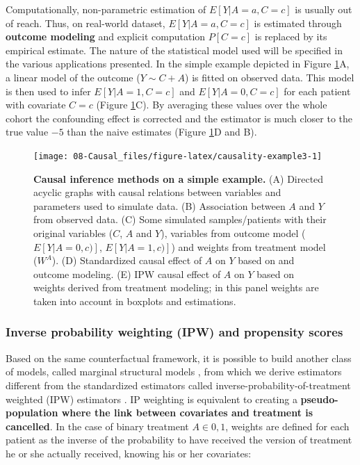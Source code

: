 \documentclass[a4paper,12pt,twoside,onecolumn,openright,final,oldfontcommands]{memoir}
\begin{document}
Computationally, non-parametric estimation of \(E[Y | A=a, C=c]\) is
usually out of reach. Thus, on real-world dataset, \(E[Y | A=a, C=c]\)
is estimated through \textbf{outcome modeling} and explicit computation
\(P[C=c]\) is replaced by its empirical estimate. The nature of the
statistical model used will be specified in the various applications
presented. In the simple example depicted in Figure
\ref{fig:causality-example3}A, a linear model of the outcome
(\(Y\sim C+A\)) is fitted on observed data. This model is then used to
infer \(E[Y | A=1, C=c]\) and \(E[Y | A=0, C=c]\) for each patient with
covariate \(C=c\) (Figure \ref{fig:causality-example3}C). By averaging
these values over the whole cohort the confounding effect is corrected
and the estimator is much closer to the true value \(-5\) than the naive
estimates (Figure \ref{fig:causality-example3}D and B).

\begin{figure}

{\centering \texttt{[image: 08-Causal\_files/figure-latex/causality-example3-1]} 

}

\caption[Causal inference methods on a simple example]{\textbf{Causal inference methods on a
simple example.} (A) Directed acyclic graphs with causal relations
between variables and parameters used to simulate data. (B) Association
between \(A\) and \(Y\) from observed data. (C) Some simulated
samples/patients with their original variables (\(C\), \(A\) and \(Y\)),
variables from outcome model (\(E[Y|A=0,c)]\), \(E[Y|A=1,c)]\)) and
weights from treatment model (\(W^A\)). (D) Standardized causal effect
of \(A\) on \(Y\) based on and outcome modeling. (E) IPW causal effect
of \(A\) on \(Y\) based on weights derived from treatment modeling; in
this panel weights are taken into account in boxplots and estimations.}\label{fig:causality-example3}
\end{figure}












\subsubsection{Inverse probability weighting (IPW) and propensity
scores}\label{IPW-classic}

Based on the same counterfactual framework, it is possible to build
another class of models, called marginal structural models
\citep{robins2000marginal}, from which we derive estimators different
from the standardized estimators called inverse-probability-of-treatment
weighted (IPW) estimators \citep{cole2008constructing}. IP weighting is
equivalent to creating a \textbf{pseudo-population where the link
between covariates and treatment is cancelled}. In the case of binary
treatment \(A \in {0 ,1}\), weights are defined for each patient as the
inverse of the probability to have received the version of treatment he
or she actually received, knowing his or her covariates:
\end{document}
